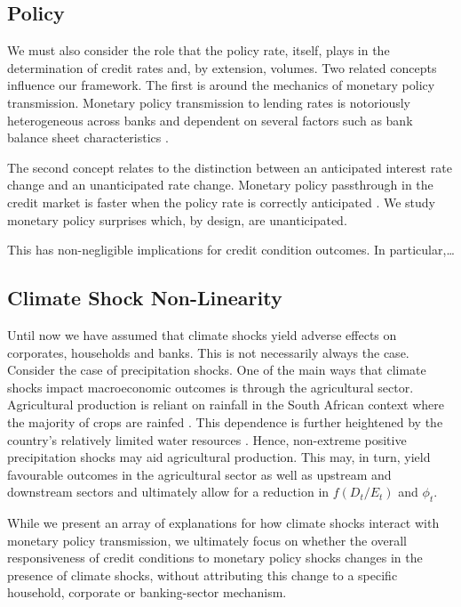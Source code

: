 \documentclass[
  letterpaper,
  DIV=11,
  numbers=noendperiod]{scrartcl}
\begin{document}
\subsection{Policy}\label{policy}

We must also consider the role that the policy rate, itself, plays in
the determination of credit rates and, by extension, volumes. Two
related concepts influence our framework. The first is around the
mechanics of monetary policy transmission. Monetary policy transmission
to lending rates is notoriously heterogeneous across banks and dependent
on several factors such as bank balance sheet characteristics
\citep{ALTAVILLA202081}.

The second concept relates to the distinction between an anticipated
interest rate change and an unanticipated rate change. Monetary policy
passthrough in the credit market is faster when the policy rate is
correctly anticipated \citep{KLEIMEIER20061839}. We study monetary
policy surprises which, by design, are unanticipated.

This has non-negligible implications for credit condition outcomes. In
particular,\ldots{}

\subsection{Climate Shock
Non-Linearity}\label{climate-shock-non-linearity}

Until now we have assumed that climate shocks yield adverse effects on
corporates, households and banks. This is not necessarily always the
case. Consider the case of precipitation shocks. One of the main ways
that climate shocks impact macroeconomic outcomes is through the
agricultural sector. Agricultural production is reliant on rainfall in
the South African context where the majority of crops are rainfed
\citep{Hartley2021ClimateUncertainty} . This dependence is further
heightened by the country's relatively limited water resources
\citep{GovernmentSouthAfrica2024WaterSanitation}. Hence, non-extreme
positive precipitation shocks may aid agricultural production. This may,
in turn, yield favourable outcomes in the agricultural sector as well as
upstream and downstream sectors and ultimately allow for a reduction in
\(f(D_t/E_t)\) and \(\phi_{t}\).

While we present an array of explanations for how climate shocks
interact with monetary policy transmission, we ultimately focus on
whether the overall responsiveness of credit conditions to monetary
policy shocks changes in the presence of climate shocks, without
attributing this change to a specific household, corporate or
banking-sector mechanism.
\end{document}
